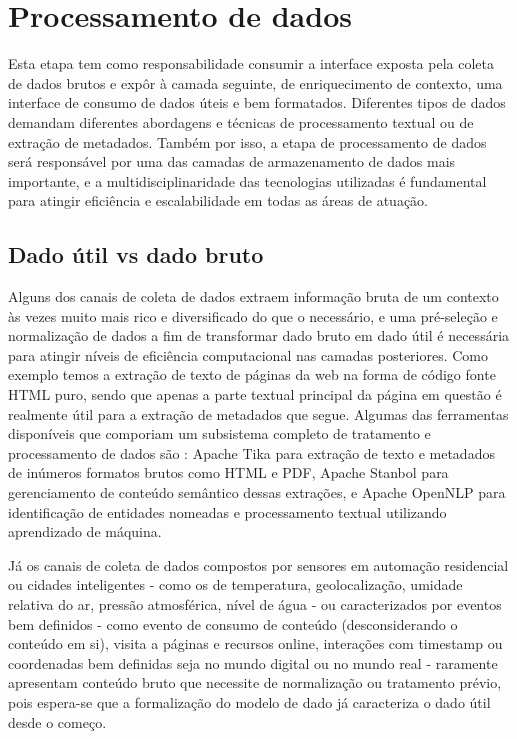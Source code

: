 \chapter{Processamento de dados} \label{c:processamento_de_dados}

Esta etapa tem como responsabilidade consumir a interface exposta pela coleta de dados brutos e expôr à camada seguinte, de enriquecimento de contexto, uma interface de consumo de dados úteis e bem formatados. Diferentes tipos de dados demandam diferentes abordagens e técnicas de processamento textual ou de extração de metadados. Também por isso, a etapa de processamento de dados será responsável por uma das camadas de armazenamento de dados mais importante, e a multidisciplinaridade das tecnologias utilizadas é fundamental para atingir eficiência e escalabilidade em todas as áreas de atuação.

\section{Dado útil vs dado bruto} \label{s:dado_util_vs_dado_bruto}

Alguns dos canais de coleta de dados extraem informação bruta de um contexto às vezes muito mais rico e diversificado do que o necessário, e uma pré-seleção e normalização de dados a fim de transformar dado bruto em dado útil é necessária para atingir níveis de eficiência computacional nas camadas posteriores. Como exemplo temos a extração de texto de páginas da web na forma de código fonte HTML puro, sendo que apenas a parte textual principal da página em questão é realmente útil para a extração de metadados que segue. Algumas das ferramentas disponíveis que comporiam um subsistema completo de tratamento e processamento de dados são \cite{ital:jung-andrew}: Apache Tika \cite{apache:tika} para extração de texto e metadados de inúmeros formatos brutos como HTML e PDF, Apache Stanbol \cite{apache:stanbol} para gerenciamento de conteúdo semântico dessas extrações, e Apache OpenNLP \cite{apache:opennlp} para identificação de entidades nomeadas e processamento textual utilizando aprendizado de máquina.

Já os canais de coleta de dados compostos por sensores em automação residencial ou cidades inteligentes - como os de temperatura, geolocalização, umidade relativa do ar, pressão atmosférica, nível de água - ou caracterizados por eventos bem definidos - como evento de consumo de conteúdo (desconsiderando o conteúdo em si), visita a páginas e recursos online, interações com timestamp ou coordenadas bem definidas seja no mundo digital ou no mundo real - raramente apresentam conteúdo bruto que necessite de normalização ou tratamento prévio, pois espera-se que a formalização do modelo de dado já caracteriza o dado útil desde o começo.

